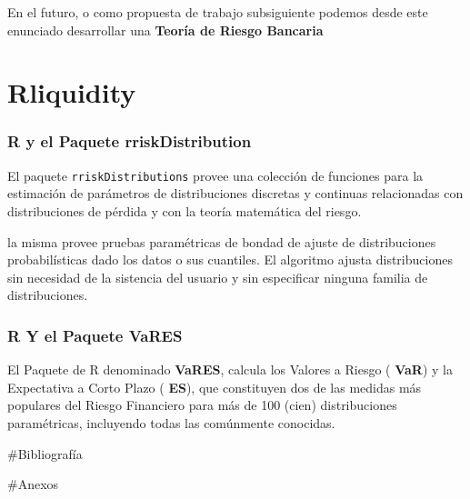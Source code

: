 \documentclass[]{article}
\begin{document}
En el futuro, o como propuesta de trabajo subsiguiente podemos desde
este enunciado desarrollar una \textbf{Teoría de Riesgo Bancaria}

\hypertarget{rliquidity}{%
\section{Rliquidity}\label{rliquidity}}

\hypertarget{r-y-el-paquete-rriskdistribution}{%
\subsubsection{\texorpdfstring{R y el Paquete
\textbf{rriskDistribution}}{R y el Paquete rriskDistribution}}\label{r-y-el-paquete-rriskdistribution}}

El paquete \texttt{rriskDistributions} provee una colección de funciones
para la estimación de parámetros de distribuciones discretas y continuas
relacionadas con distribuciones de pérdida y con la teoría matemática
del riesgo.

la misma provee pruebas paramétricas de bondad de ajuste de
distribuciones probabilísticas dado los datos o sus cuantiles. El
algoritmo ajusta distribuciones sin necesidad de la sistencia del
usuario y sin especificar ninguna familia de distribuciones.

\hypertarget{r-y-el-paquete-vares}{%
\subsubsection{\texorpdfstring{R Y el Paquete
\textbf{VaRES}}{R Y el Paquete VaRES}}\label{r-y-el-paquete-vares}}

El Paquete de R denominado \textbf{VaRES}, calcula los Valores a Riesgo
( \textbf{VaR}) y la Expectativa a Corto Plazo ( \textbf{ES}), que
constituyen dos de las medidas más populares del Riesgo Financiero para
más de 100 (cien) distribuciones paramétricas, incluyendo todas las
comúnmente conocidas.

\#Bibliografía

\#Anexos
\end{document}
